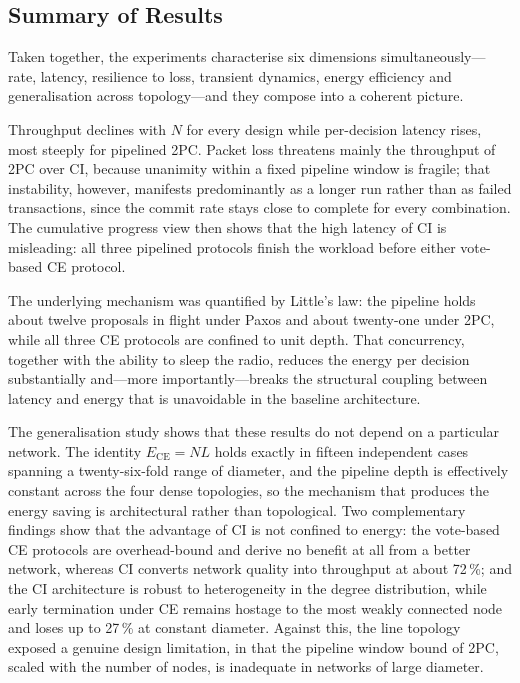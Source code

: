 \documentclass[journal]{IEEEtran}
\newcommand{\CI}{CI}                      %
\newcommand{\CE}{CE}                      %
\newcommand{\Nnodes}{N}                   %
\newcommand{\Ece}{E_{\mathrm{CE}}}        %
\begin{document}
\subsection{Summary of Results}
\label{sec:results-summary}

Taken together, the experiments characterise six dimensions
simultaneously---rate, latency, resilience to loss, transient dynamics,
energy efficiency and generalisation across topology---and they compose
into a coherent picture.

Throughput declines with $\Nnodes$ for every design while per-decision
latency rises, most steeply for pipelined 2PC. Packet loss threatens
mainly the throughput of 2PC over \CI, because unanimity within a fixed
pipeline window is fragile; that instability, however, manifests
predominantly as a longer run rather than as failed transactions, since
the commit rate stays close to complete for every combination. The
cumulative progress view then shows that the high latency of \CI{} is
misleading: all three pipelined protocols finish the workload before
either vote-based \CE{} protocol.

The underlying mechanism was quantified by Little's law: the pipeline
holds about twelve proposals in flight under Paxos and about twenty-one under
2PC, while all three \CE{} protocols are confined to unit depth. That
concurrency, together with the ability to sleep the radio, reduces the
energy per decision substantially and---more importantly---breaks the
structural coupling between latency and energy that is unavoidable in the
baseline architecture.

The generalisation study shows that these results do not depend on a
particular network. The identity $\Ece = \Nnodes L$ holds exactly in fifteen
independent cases spanning a twenty-six-fold range of
diameter, and the pipeline depth is effectively constant across the four
dense topologies, so the mechanism that produces the energy saving is
architectural rather than topological. Two complementary findings show
that the advantage of \CI{} is not confined to energy: the vote-based
\CE{} protocols are overhead-bound and derive no benefit at all from a
better network, whereas \CI{} converts network quality into throughput at
about 72\,\%; and the \CI{} architecture is robust to heterogeneity in the
degree distribution, while early termination under \CE{} remains hostage
to the most weakly connected node and loses up to 27\,\% at constant
diameter. Against this, the line topology exposed a genuine design
limitation, in that the pipeline window bound of 2PC, scaled with the
number of nodes, is inadequate in networks of large diameter.
\end{document}
